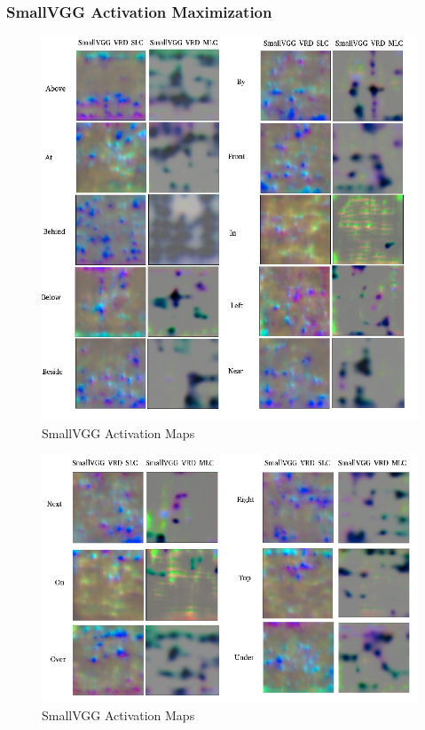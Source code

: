 \documentclass{csfyp}
\begin{document}
\subsubsection{SmallVGG Activation Maximization}

\begin{figure}[!htbp]
\includegraphics[scale=0.60,center]{SmallVGG_VRD.pdf}
\caption{SmallVGG Activation Maps}
\end{figure}

\begin{figure}[!htbp]
\includegraphics[scale=0.60,center]{Small_VRD_2.pdf}
\caption{SmallVGG Activation Maps}
\end{figure}
\end{document}
